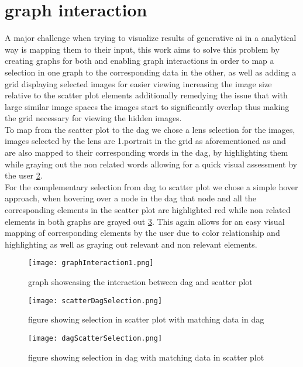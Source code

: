 \documentclass[
  a4paper,  %
  twoside,  %
  bibliography=totoc,
  headsepline,
  cleardoublepage=empty,
  parskip=half,
  draft=false
]{scrbook}
\begin{document}
\section{graph interaction}
A major challenge when trying to visualize results of generative ai in a analytical way is mapping them to their input, this work aims to solve this problem by creating graphs for both and enabling graph interactions in order to map a selection in one graph to the corresponding data in the other, as well as adding a grid displaying selected images for easier viewing increasing the image size relative to the scatter plot elements additionally remedying the issue that with large similar image spaces the images start to significantly overlap thus making the grid necessary for viewing the hidden images.\\
To map from the scatter plot to the dag we chose a lens selection for the images, images selected by the lens are 1.portrait in the grid as aforementioned as and are also mapped to their corresponding words in the dag, by highlighting them while graying out the non related words allowing for a quick visual assessment by the user \cref{fig:scatterDagSelection}.\\
For the complementary selection from dag to scatter plot we chose a simple hover approach, when hovering over a node in the dag that node and all the corresponding elements in the scatter plot are highlighted red while non related elements in both graphs are grayed out \cref{fig:dagScatterSelection}. This again allows for an easy visual mapping of corresponding elements by the user due to color relationship and highlighting as well as graying out relevant and non relevant elements. 


\begin{figure}[H]
	\centering
	\texttt{[image: graphInteraction1.png]}
	\caption{graph showcasing the interaction between dag and scatter plot}
	\label{fig:graphInteraction}
\end{figure}

\begin{figure}[H]
	\centering
	\texttt{[image: scatterDagSelection.png]}
	\caption{figure showing selection in scatter plot with matching data in dag}
	\label{fig:scatterDagSelection}
\end{figure}
\begin{figure}[H]
	\centering
	\texttt{[image: dagScatterSelection.png]}
	\caption{figure showing selection in dag with matching data in scatter plot}
	\label{fig:dagScatterSelection}
\end{figure}
\end{document}
